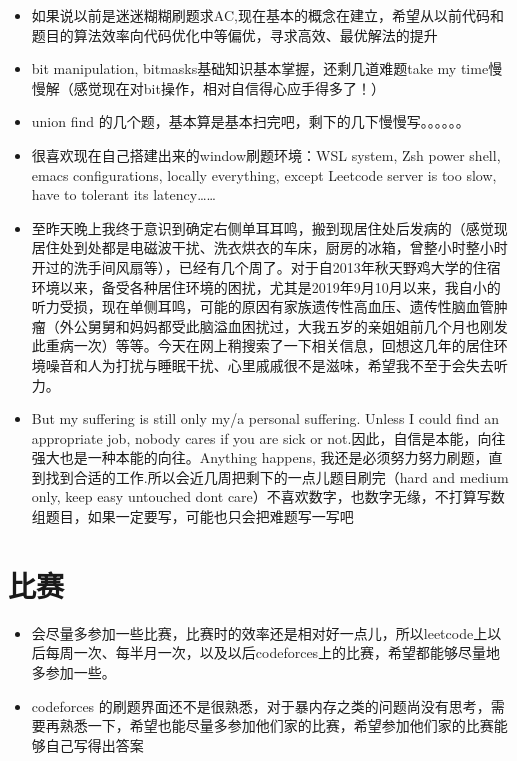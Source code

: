 \documentclass[9pt, b5paaper]{book}
\begin{document}
\begin{itemize}
\item 如果说以前是迷迷糊糊刷题求AC,现在基本的概念在建立，希望从以前代码和题目的算法效率向代码优化中等偏优，寻求高效、最优解法的提升
\item bit manipulation, bitmasks基础知识基本掌握，还剩几道难题take my time慢慢解（感觉现在对bit操作，相对自信得心应手得多了！）
\item union find 的几个题，基本算是基本扫完吧，剩下的几下慢慢写。。。。。。

\item 很喜欢现在自己搭建出来的window刷题环境：WSL system, Zsh power shell, emacs configurations, locally everything, except Leetcode server is too slow, have to tolerant its latency\ldots{}\ldots{}

\item 至昨天晚上我终于意识到确定右侧单耳耳鸣，搬到现居住处后发病的（感觉现居住处到处都是电磁波干扰、洗衣烘衣的车床，厨房的冰箱，曾整小时整小时开过的洗手间风扇等），已经有几个周了。对于自2013年秋天野鸡大学的住宿环境以来，备受各种居住环境的困扰，尤其是2019年9月10月以来，我自小的听力受损，现在单侧耳鸣，可能的原因有家族遗传性高血压、遗传性脑血管肿瘤（外公舅舅和妈妈都受此脑溢血困扰过，大我五岁的亲姐姐前几个月也刚发此重病一次）等等。今天在网上稍搜索了一下相关信息，回想这几年的居住环境噪音和人为打扰与睡眠干扰、心里戚戚很不是滋味，希望我不至于会失去听力。
\item But my suffering is still only my/a personal suffering. Unless I could find an appropriate job, nobody cares if you are sick or not.因此，自信是本能，向往强大也是一种本能的向往。Anything happens, 我还是必须努力努力刷题，直到找到合适的工作.所以会近几周把剩下的一点儿题目刷完（hard and medium only, keep easy untouched dont care）不喜欢数字，也数字无缘，不打算写数组题目，如果一定要写，可能也只会把难题写一写吧
\end{itemize}

\section{比赛}
\label{sec-1-2}
\begin{itemize}
\item 会尽量多参加一些比赛，比赛时的效率还是相对好一点儿，所以leetcode上以后每周一次、每半月一次，以及以后codeforces上的比赛，希望都能够尽量地多参加一些。
\item codeforces 的刷题界面还不是很熟悉，对于暴内存之类的问题尚没有思考，需要再熟悉一下，希望也能尽量多参加他们家的比赛，希望参加他们家的比赛能够自己写得出答案
\end{itemize}
\end{document}
